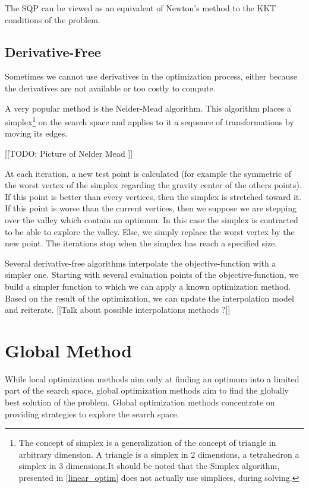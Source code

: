 The SQP can be viewed as an equivalent of Newton's method to the KKT conditions of the problem.



\subsection{Derivative-Free}

Sometimes we cannot use derivatives in the optimization process, either because the derivatives are not available or too costly to compute.

A very popular method is the Nelder-Mead algorithm. This algorithm places a simplex\footnote{The concept of simplex is a generalization of the concept of triangle in arbitrary dimension. A triangle is a simplex in 2 dimensions, a tetrahedron a simplex in 3 dimensions.It should be noted that the Simplex algorithm, presented in \ref{linear_optim} does not actually use simplices, during solving.} on the search space and applies to it a sequence of transformations by moving its edges.

[[TODO: Picture of Nelder Mead ]]

At each iteration, a new test point is calculated (for example the symmetric of the worst vertex of the simplex regarding the gravity center of the others points). If this point is better than every vertices, then the simplex is stretched toward it. If this point is worse than the current vertices, then we suppose we are stepping over the valley which contain an optimum. In this case the simplex is contracted to be able to explore the valley. Else, we simply replace the worst vertex by the new point.
The iterations stop when the simplex has reach a specified size.


Several derivative-free algorithms interpolate the objective-function with a simpler one. Starting with several evaluation points of the objective-function, we build a simpler function to which we can apply a known optimization method. Based on the result of the optimization, we can update the interpolation model and reiterate.
[[Talk about possible interpolations methods ?]]

\section{Global Method}

While local optimization methods aim only at finding an optimum into a limited part of the search space, global optimization methods aim to find the globally best solution of the problem. Global optimization methods concentrate on providing strategies to explore the search space.

